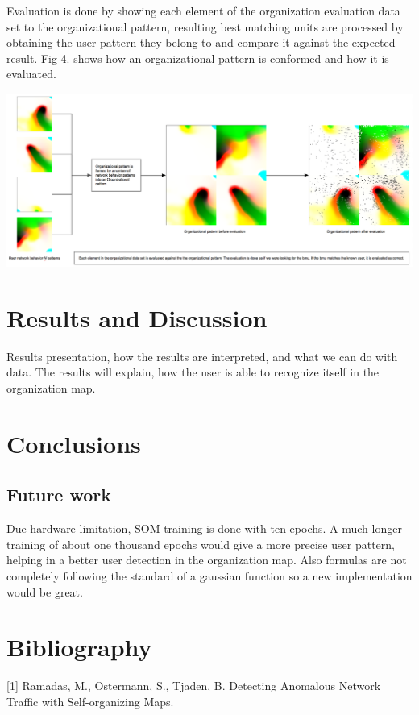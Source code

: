 \documentclass{article}
\begin{document}
Evaluation is done by showing each element of the organization evaluation data set to the organizational pattern, resulting best matching units are processed by obtaining the user pattern they belong to and compare it against the expected result. Fig 4. shows how an organizational pattern is conformed and how it is evaluated.

	\begin{center}\includegraphics[scale=0.3]{evaluation} \end{center}

\section{Results and Discussion} %
Results presentation, how the results are interpreted, and what we can do with data.
The results will explain, how the user is able to recognize itself in the organization map.






\section{Conclusions} %

\subsection{Future work} %
Due hardware limitation, SOM training is done with ten epochs. A much longer training of about one thousand epochs would give a more precise user pattern, helping in a better user detection in the organization map.
Also formulas are not completely following the standard of a gaussian function so a new implementation would be great.






\section{Bibliography} %
[1] Ramadas, M., Ostermann, S.,  Tjaden, B. Detecting Anomalous Network Traffic with Self-organizing Maps.
\end{document}
